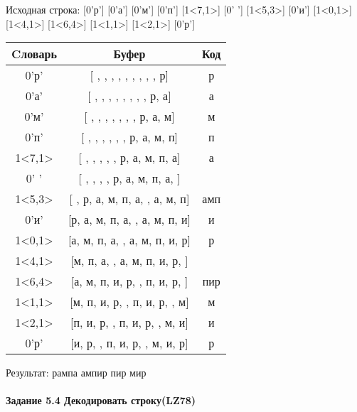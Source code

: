 \documentclass[a4paper, 12pt]{article}
\begin{document}
Исходная строка: [0'р'] [0'а'] [0'м'] [0'п'] [1<7,1>] [0' '] [1<5,3>] [0'и'] [1<0,1>] [1<4,1>] [1<6,4>] [1<1,1>] [1<2,1>] [0'р']\\
\begin{table}[h!]
\centering
\begin{tabular}{|c|c|c|}
\hline
 Cловарь & Буфер & Код  \\ \hline
0'р' & [ ,  ,  ,  ,  ,  ,  ,  ,  , р] & р
\\ \hline
0'а' & [ ,  ,  ,  ,  ,  ,  ,  , р, а] & а
\\ \hline
0'м' & [ ,  ,  ,  ,  ,  ,  , р, а, м] & м
\\ \hline
0'п' & [ ,  ,  ,  ,  ,  , р, а, м, п] & п
\\ \hline
1<7,1> & [ ,  ,  ,  ,  , р, а, м, п, а] & а
\\ \hline
0' ' & [ ,  ,  ,  , р, а, м, п, а,  ] &  
\\ \hline
1<5,3> & [ , р, а, м, п, а,  , а, м, п] & амп
\\ \hline
0'и' & [р, а, м, п, а,  , а, м, п, и] & и
\\ \hline
1<0,1> & [а, м, п, а,  , а, м, п, и, р] & р
\\ \hline
1<4,1> & [м, п, а,  , а, м, п, и, р,  ] &  
\\ \hline
1<6,4> & [а, м, п, и, р,  , п, и, р,  ] & пир 
\\ \hline
1<1,1> & [м, п, и, р,  , п, и, р,  , м] & м
\\ \hline
1<2,1> & [п, и, р,  , п, и, р,  , м, и] & и
\\ \hline
0'р' & [и, р,  , п, и, р,  , м, и, р] & р
\\ \hline
\end{tabular}
\end{table}

Результат: рампа ампир пир мир
\pagebreak
\paragraph{Задание 5.4 Декодировать строку(LZ78)\\}
\end{document}
